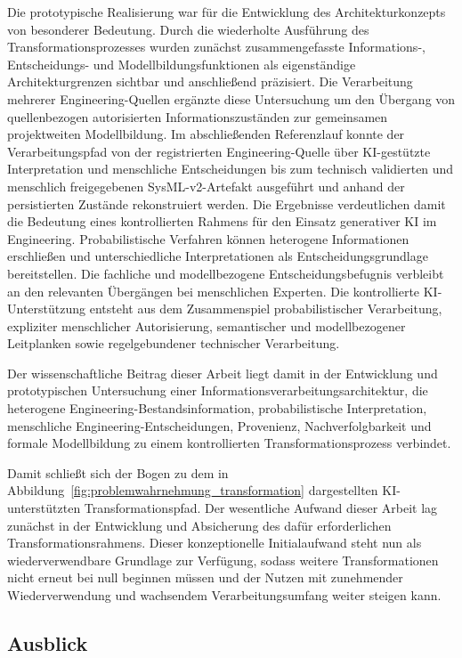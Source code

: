 Die prototypische Realisierung war für die Entwicklung des
Architekturkonzepts von besonderer Bedeutung. Durch die wiederholte
Ausführung des Transformationsprozesses wurden zunächst zusammengefasste
Informations-, Entscheidungs- und Modellbildungsfunktionen als eigenständige
Architekturgrenzen sichtbar und anschließend präzisiert. Die Verarbeitung
mehrerer Engineering-Quellen ergänzte diese Untersuchung um den Übergang von
quellenbezogen autorisierten Informationszuständen zur gemeinsamen
projektweiten Modellbildung. Im abschließenden Referenzlauf konnte der
Verarbeitungspfad von der registrierten Engineering-Quelle über
KI-gestützte Interpretation und menschliche Entscheidungen bis zum technisch
validierten und menschlich freigegebenen SysML-v2-Artefakt ausgeführt und
anhand der persistierten Zustände rekonstruiert werden.
\newpage
Die Ergebnisse verdeutlichen damit die Bedeutung eines kontrollierten
Rahmens für den Einsatz generativer KI im Engineering. Probabilistische
Verfahren können heterogene Informationen erschließen und unterschiedliche
Interpretationen als Entscheidungsgrundlage bereitstellen. Die fachliche und
modellbezogene Entscheidungsbefugnis verbleibt an den relevanten Übergängen
bei menschlichen Experten. Die kontrollierte KI-Unterstützung entsteht aus
dem Zusammenspiel probabilistischer Verarbeitung, expliziter menschlicher
Autorisierung, semantischer und modellbezogener Leitplanken sowie
regelgebundener technischer Verarbeitung.

Der wissenschaftliche Beitrag dieser Arbeit liegt damit in der Entwicklung
und prototypischen Untersuchung einer Informationsverarbeitungsarchitektur,
die heterogene Engineering-Bestandsinformation, probabilistische
Interpretation, menschliche Engineering-Entscheidungen, Provenienz,
Nachverfolgbarkeit und formale Modellbildung zu einem kontrollierten
Transformationsprozess verbindet.

Damit schließt sich der Bogen zu dem in
Abbildung~\ref{fig:problemwahrnehmung_transformation} dargestellten
KI-unterstützten Transformationspfad. Der wesentliche Aufwand dieser Arbeit
lag zunächst in der Entwicklung und Absicherung des dafür erforderlichen
Transformationsrahmens. Dieser konzeptionelle Initialaufwand steht nun als
wiederverwendbare Grundlage zur Verfügung, sodass weitere Transformationen
nicht erneut bei null beginnen müssen und der Nutzen mit zunehmender
Wiederverwendung und wachsendem Verarbeitungsumfang weiter steigen kann.

\subsection{Ausblick}
\label{sec:ausblick}

